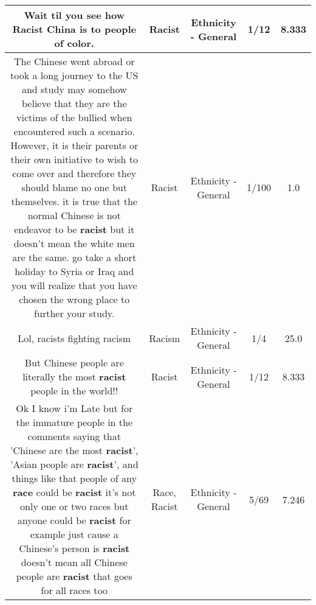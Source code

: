 \documentclass[11pt]{article}
\newlength\mylength
\begin{document}
\begin{center}
\begin{longtable}{|C{.65\mylength}|C{.30\mylength}|C{.12\mylength}|C{.12\mylength}|C{.12\mylength}|}
  \small Wait til you see how \textbf{Racist} China is to people of color.\normalsize   & Racist & Ethnicity - General & 1/12 & 8.333 \\  \hline
  \small The Chinese went abroad or took a long journey to the US and study may somehow believe that they are the victims of the bullied when encountered such a scenario. However, it is their parents or their own initiative to wish to come over and therefore they should blame no one but themselves. it is true that the normal Chinese is not endeavor to be \textbf{racist} but it doesn't mean the white men are the same. go take a short holiday to Syria or Iraq and you will realize that you have chosen the wrong place to further your study.\normalsize   & Racist & Ethnicity - General & 1/100 & 1.0 \\  \hline
  \small Lol, racists fighting racism\normalsize   & Racism & Ethnicity - General & 1/4 & 25.0 \\  \hline
  \small But Chinese people are literally the most \textbf{racist} people in the world!!\normalsize   & Racist & Ethnicity - General & 1/12 & 8.333 \\  \hline
  \small Ok I know i'm Late but for the immature people in the comments saying that 'Chinese are the most \textbf{racist}', 'Asian people are \textbf{racist}', and things like that people of any  \textbf{race} could be \textbf{racist} it's not only one or two races but anyone could be \textbf{racist} for example just cause a Chinese's person is \textbf{racist} doesn't mean all Chinese people are \textbf{racist} that goes for all races too\normalsize   & Race, Racist & Ethnicity - General & 5/69 & 7.246 \\  \hline

\end{longtable}
\end{center}
\end{document}
